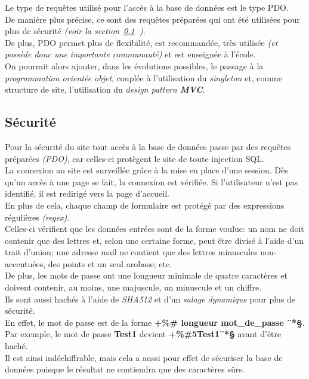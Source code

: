Le type de requêtes utilisé pour l'accès à la base de données est le type PDO.\\
De manière plus précise, ce sont des requêtes préparées qui ont été utilisées pour plus de sécurité \textit{(voir la section~\ref{sec:securite}\textbf{~})}.\\
De plus, PDO permet plus de flexibilité, est recommandée, très utilisée \textit{(et possède donc une importante communauté)} et est enseignée à l'école.\\

On pourrait alors ajouter, dans les évolutions possibles, le passage à la \textit{programmation orientée objet}, couplée à l’utilisation du \textit{singleton} et, comme structure de site, l’utilisation du \textit{design pattern \textbf{MVC}}.

\newpage


\subsection{Sécurité}
\label{sec:securite}

Pour la sécurité du site tout accès à la base de données passe par des requêtes préparées \textit{(PDO)}, car celles-ci protègent le site de toute injection SQL.\\

La connexion au site est surveillée grâce à la mise en place d’une session. Dès qu’un accès à une page se fait, la connexion est vérifiée. Si l’utilisateur n’est pas identifié, il est redirigé vers la page d’accueil.\\

En plus de cela, chaque champ de formulaire est protégé par des expressions régulières \textit{(regex)}.\\
Celles-ci vérifient que les données entrées sont de la forme voulue: un nom ne doit contenir que des lettres et, selon une certaine forme, peut être divisé à l’aide d’un trait d’union; une adresse mail ne contient que des lettres minuscules non-accentuées, des points et un seul arobase; etc.\\

De plus, les mots de passe ont une longueur minimale de quatre caractères et doivent contenir, au moins, une majuscule, un minuscule et un chiffre.\\
Ils sont aussi hachés à l’aide de \textit{SHA512} et d’un \textit{salage dynamique} pour plus de sécurité.\\
En effet, le mot de passe est de la forme \textbf{+\%\# longueur mot\_de\_passe  ¨*§}.\\ Par exemple, le mot de passe \textbf{Test1} devient \textbf{+\%\#5Test1¨*§} avant d’être haché.\\
Il est ainsi indéchiffrable, mais cela a aussi pour effet de sécuriser la base de données puisque le résultat ne contiendra que des caractères sûrs.

